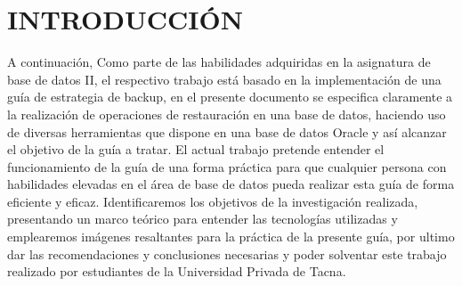 \chapter*{INTRODUCCIÓN}

A continuación, Como parte de las habilidades adquiridas en la asignatura de base de datos II, el respectivo trabajo está basado en la implementación de una guía de estrategia de backup, en el presente documento se especifica claramente a la realización de operaciones de restauración en una base de datos, haciendo uso de diversas herramientas que dispone en una base de datos Oracle y así alcanzar el objetivo de la guía a tratar.
El actual trabajo pretende entender el funcionamiento de la guía de una forma práctica para que cualquier persona con habilidades elevadas en el área de base de datos pueda realizar esta guía de forma eficiente y eficaz. 
Identificaremos los objetivos de la investigación realizada, presentando un marco teórico para entender las tecnologías utilizadas y emplearemos imágenes resaltantes para la práctica de la presente guía, por ultimo dar las recomendaciones y conclusiones necesarias y poder solventar este trabajo realizado por estudiantes de la Universidad Privada de Tacna.
